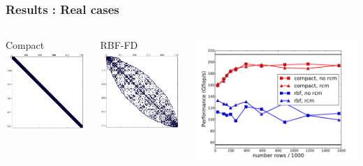 \documentclass{beamer}
\begin{document}
\begin{frame}
  \frametitle{Results : Real cases}
  \begin{columns}
    \begin{block}{Compact}
      \centering
      \includegraphics[width=.6\linewidth]{slides-figures/ICS-figures/compact_matrix-crop.png}
    \end{block}
  
    \begin{block}{RBF-FD}
      \centering
      \includegraphics[width=.6\linewidth]{slides-figures/ICS-figures/kd-tree-3d-rcm-crop.png}
    \end{block}
    
    \includegraphics[width=\linewidth]{slides-figures/ICS-figures/rbf_compact.pdf}
  \end{columns}
\end{frame}
\end{document}

